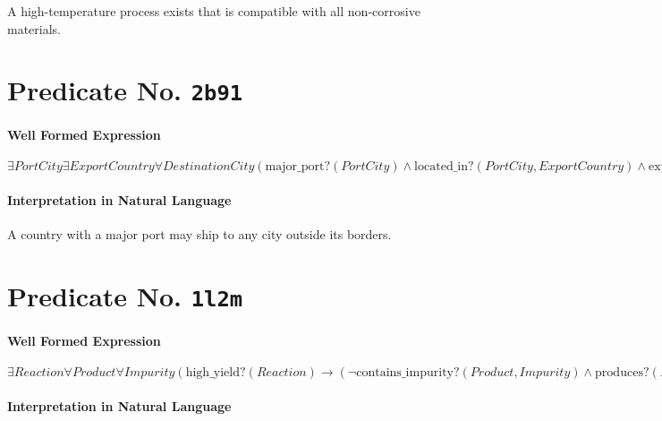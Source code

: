 \documentclass[11pt]{article}
\begin{document}
A high-temperature process exists that is compatible with all non-corrosive materials.



\section{Predicate No. \texttt{2b91}}
\label{sec:orge72e6a8}

\paragraph*{Well Formed Expression}
\label{sec:org39c1d3e}

\(\exists \mathit{PortCity} \exists \mathit{ExportCountry} \forall \mathit{DestinationCity} (\mathrm{major\_port?}(\mathit{PortCity}) \land \mathrm{located\_in?}(\mathit{PortCity},\mathit{ExportCountry}) \land \mathrm{exports\_to?}(\mathit{ExportCountry}, \mathit{DestinationCity}) \land \neg \mathrm{located\_in?}(\mathit{DestinationCity},\mathit{ExportCountry}))\)

\paragraph*{Interpretation in Natural Language}
\label{sec:org4328d33}

A country with a major port may ship to any city outside its borders.



\section{Predicate No. \texttt{1l2m}}
\label{sec:org577950e}

\paragraph*{Well Formed Expression}
\label{sec:orgb827f84}

\(\exists \mathit{Reaction} \forall \mathit{Product} \forall \mathit{Impurity} (\mathrm{high\_yield?}(\mathit{Reaction}) \rightarrow (\neg \mathrm{contains\_impurity?}(\mathit{Product}, \mathit{Impurity}) \land \mathrm{produces?}(\mathit{Reaction}, \mathit{Product})))\)

\paragraph*{Interpretation in Natural Language}
\label{sec:org568d79b}
\end{document}
